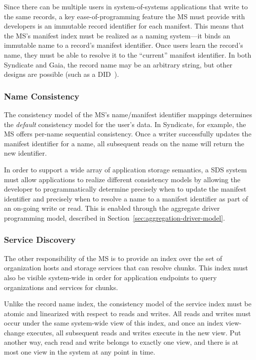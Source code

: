 Since there can be multiple users in system-of-systems applications that write
to the same records, a key ease-of-programming
feature the MS must provide with developers is an immutable record identifier
for each manifest.  This means that the MS's manifest index must be realized as
a naming system---it binds an immutable name to a record's manifest identifier.
Once users learn the record's name, they must be able to resolve it to the
``current'' manifest identifier.  In both Syndicate and Gaia, the record
name may be an arbitrary string, but other designs are possible (such as a
DID~\cite{decentralized-identifiers}).

\subsubsection{Name Consistency}

The consistency model of the MS's name/manifest identifier mappings determines the \emph{default}
consistency model for the user's data.
In Syndicate, for example, the MS offers
per-name sequential consistency.  Once a writer successfully updates the manifest
identifier for a name, all subsequent reads on the name will return the new
identifier.

In order to support a wide array of application storage semantics, a
SDS system must allow applications to realize different consistency
models by allowing the developer to programmatically determine precisely
when to update the manifest identifier and precisely when to resolve a name to a
manifest identifier as part of an on-going write or read.
This is enabled through the aggregate driver programming model,
described in Section~\ref{sec:aggregation-driver-model}.

\subsubsection{Service Discovery}

The other responsibility of the MS is to provide an index over the set of
organization hosts and storage services that can resolve chunks.  This index
must also be visible system-wide in order for application endpoints to query
organizations and services for chunks.

Unlike the record name index, the consistency model of the service
index must be atomic and linearized with respect to reads and writes.
All reads and writes must occur under the same system-wide view of this
index, and once an index view-change executes, all subsequent reads and writes
execute in the new view.  Put another way, each read and write belongs to
exactly one view, and there is at most one view in the system at any point in
time.

